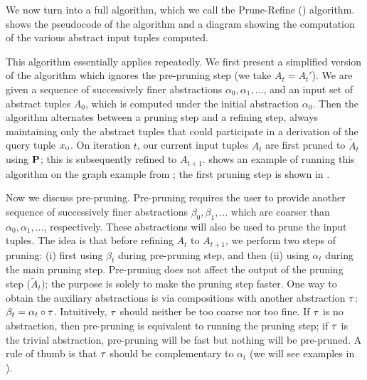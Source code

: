 We now turn  into a full algorithm, which we call the
Prune-Refine (\PR) algorithm.   shows the pseudocode
of the algorithm and a diagram showing the computation of the various abstract
input tuples computed.

This algorithm essentially applies  repeatedly.
We first present a simplified version of the algorithm which
ignores the pre-pruning step (we take $A_t = A_t'$).
We are given a sequence of successively finer abstractions $\alpha_0, \alpha_1, \dots$,
and an input set of abstract tuples $A_0$, which is computed
under the initial abstraction $\alpha_0$.  Then the algorithm alternates between a pruning step
and a refining step, always maintaining only the abstract tuples
that could participate in a derivation of the query tuple $x_\text{\sc o}$.
On iteration $t$, our current input tuples $A_t$ are first pruned to $\tilde A_t$ using $\mathbf{P}$;
this is subsequently refined to $A_{t+1}$.
 shows an example of running this algorithm on the graph
example from ; the first pruning step is shown in
.


Now we discuss pre-pruning.  Pre-pruning requires the user to provide
another sequence of successively finer abstractions $\beta_0, \beta_1, \dots$
which are coarser than $\alpha_0, \alpha_1, \dots$, respectively.
These abstractions will also be used to prune the input tuples.
The idea is that before refining $A_t$ to $A_{t+1}$,
we perform two steps of pruning:
(i) first using $\beta_t$ during pre-pruning step, and then
(ii) using $\alpha_t$ during the main pruning step.
Pre-pruning does not affect the output of the pruning step ($\tilde A_t$);
the purpose is solely to make the pruning step faster.
One way to obtain the auxiliary abstractions is via
compositions with another abstraction $\tau$: $\beta_t = \alpha_t \circ \tau$.
Intuitively, $\tau$ should neither be too coarse nor too fine.
If $\tau$ is no abstraction, then pre-pruning is equivalent to running the pruning step;
if $\tau$ is the trivial abstraction, pre-pruning will be fast but nothing will be pre-pruned.
A rule of thumb is that $\tau$ should be complementary to $\alpha_t$
(we will see examples in ).

